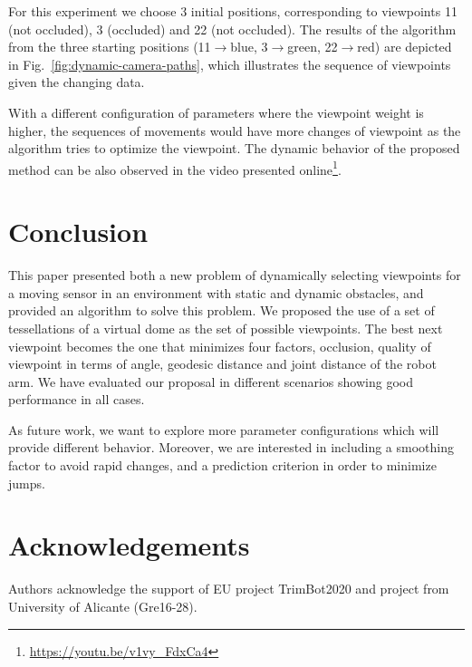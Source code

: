 \documentclass[10pt,twocolumn,letterpaper]{article}
\begin{document}
For this experiment we choose 3 initial positions, corresponding to viewpoints 11 (not occluded), 3 (occluded) and 22 (not occluded). 
The results of the algorithm from the three starting positions (11$\rightarrow$blue, 3$\rightarrow$green, 22$\rightarrow$red) are depicted in Fig.~\ref{fig:dynamic-camera-paths}, which illustrates the sequence of viewpoints given the changing data.
%

With a different configuration of parameters where the viewpoint weight is higher, the sequences of movements would have more changes of viewpoint as the algorithm tries to optimize the viewpoint. The dynamic behavior of the proposed method can be also observed in the video presented online\footnote{\url{https://youtu.be/v1vy_FdxCa4}}.

\section{Conclusion}\label{sec:conclusion}

This paper presented both a new problem of dynamically selecting viewpoints for a moving sensor in an environment with static and dynamic obstacles, and provided an algorithm to solve this problem. 
We proposed the use of a set of tessellations of a virtual dome as the set of possible viewpoints. 
The best next viewpoint becomes the one that minimizes four factors, occlusion, quality of viewpoint in terms of angle, geodesic distance and joint distance of the robot arm. 
We have evaluated our proposal in different scenarios showing good performance in all cases.

As future work, we want to explore more parameter configurations which will provide different behavior. 
Moreover, we are interested in including a smoothing factor to avoid rapid changes, and a prediction criterion in order to minimize jumps.

\section*{Acknowledgements}

Authors acknowledge the support of EU project TrimBot2020 and project from University of Alicante (Gre16-28).

{\small
  
  
}
\end{document}
